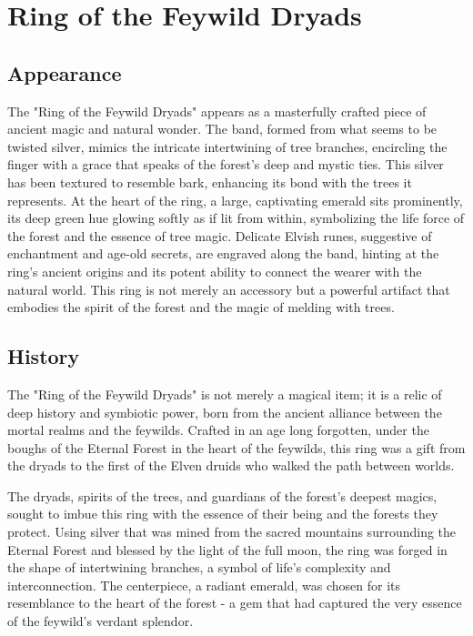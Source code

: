 
\chapter*{Ring of the Feywild Dryads}
\section*{Appearance}
The "Ring of the Feywild Dryads" appears as a masterfully crafted piece of ancient magic and natural wonder. The band, formed from what seems to be twisted silver, mimics the intricate intertwining of tree branches, encircling the finger with a grace that speaks of the forest's deep and mystic ties. This silver has been textured to resemble bark, enhancing its bond with the trees it represents. At the heart of the ring, a large, captivating emerald sits prominently, its deep green hue glowing softly as if lit from within, symbolizing the life force of the forest and the essence of tree magic. Delicate Elvish runes, suggestive of enchantment and age-old secrets, are engraved along the band, hinting at the ring's ancient origins and its potent ability to connect the wearer with the natural world. This ring is not merely an accessory but a powerful artifact that embodies the spirit of the forest and the magic of melding with trees.
\vfill\eject
\section*{History}
The "Ring of the Feywild Dryads" is not merely a magical item; it is a relic of deep history and symbiotic power, born from the ancient alliance between the mortal realms and the feywilds. Crafted in an age long forgotten, under the boughs of the Eternal Forest in the heart of the feywilds, this ring was a gift from the dryads to the first of the Elven druids who walked the path between worlds.

The dryads, spirits of the trees, and guardians of the forest's deepest magics, sought to imbue this ring with the essence of their being and the forests they protect. Using silver that was mined from the sacred mountains surrounding the Eternal Forest and blessed by the light of the full moon, the ring was forged in the shape of intertwining branches, a symbol of life's complexity and interconnection. The centerpiece, a radiant emerald, was chosen for its resemblance to the heart of the forest - a gem that had captured the very essence of the feywild's verdant splendor.

